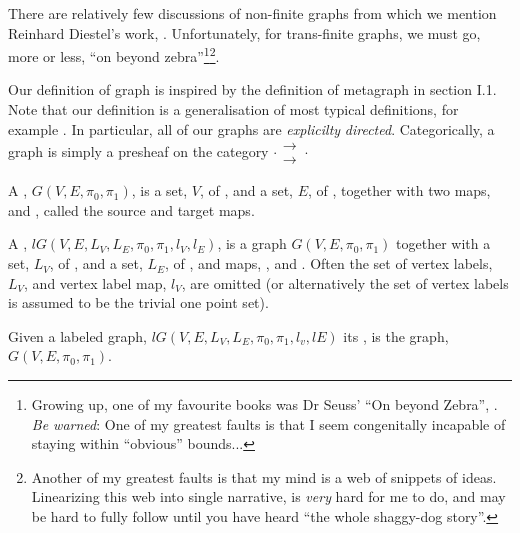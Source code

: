 There are relatively few discussions of non-finite graphs from which we mention Reinhard
Diestel's work, \cite{diestel2006graphTheory, diestel1990infiniteGraphTheory}.
Unfortunately, for trans-finite graphs, we must go, more or less, ``on beyond
zebra''\footnote{Growing up, one of my favourite books was Dr Seuss' ``On beyond Zebra'',
\cite{seuss1955onBeyondZebra}. \emph{Be warned}: One of my greatest faults is that I seem
congenitally incapable of staying within ``obvious'' bounds...}\footnote{Another of my
greatest faults is that my mind is a web of snippets of ideas. Linearizing this web into
single narrative, is \emph{very} hard for me to do, and may be hard to fully follow until 
you have heard ``the whole shaggy-dog story''.}.

Our definition of graph is inspired by the definition of metagraph in
\cite{macLane1971categoriesWorkingMathematician} section I.1. Note that our definition is
a generalisation of most typical definitions, for example \cite[section
1.1]{diestel2006graphTheory}. In particular, all of our graphs are \emph{explicilty}
\emph{directed}. Categorically, a graph is simply a presheaf on the category
$ \cdot \substack{\mathbf{\longrightarrow} \\[-0.7ex] \mathbf{\longrightarrow}} \cdot $

\begin{definition}
A , $G(V, E, \pi_0, \pi_1)$, is a set, $V$, of , and a
set, $E$, of , together with two maps,  and
, called the source and target maps.

A , $lG(V, E, L_V, L_E, \pi_0, \pi_1, l_V, l_E)$, is a graph $G(V,
E, \pi_0, \pi_1)$ together with a set, $L_V$, of , and a set,
$L_E$, of , and maps, , and .
Often the set of vertex labels, $L_V$, and vertex label map, $l_V$, are omitted (or
alternatively the set of vertex labels is assumed to be the trivial one point set).
 
Given a labeled graph, $lG(V, E, L_V, L_E, \pi_0, \pi_1, l_v, lE)$ its , is the graph, $G(V, E, \pi_0, \pi_1)$.
\end{definition}

